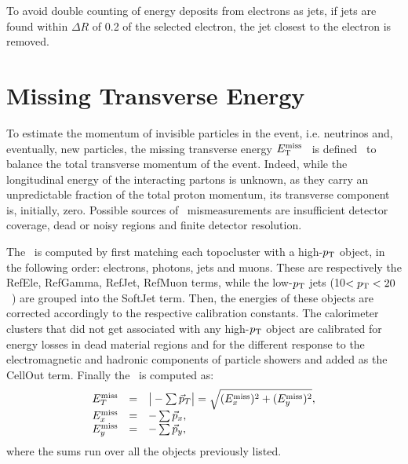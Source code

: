 To avoid double counting of energy deposits from electrons as jets,
if jets are found within $\Delta R$ of 0.2 of the selected electron, the
jet closest to the electron is removed. 


\myskip
\section{Missing Transverse Energy}\label{sec:met}

To estimate the momentum of invisible particles in the event, i.e. neutrinos and, eventually, new particles,
the missing transverse energy $\met$~\cite{met} is defined~\cite{topcommon2013} to balance the total transverse momentum of the event.
Indeed, while the longitudinal energy of the interacting partons is unknown, as they carry an unpredictable
fraction of the total proton momentum, its transverse component is, initially, zero.
Possible sources of \met\ mismeasurements are
insufficient detector coverage, dead or noisy regions and
finite detector resolution.

The \met\ is computed by first matching each topocluster
with a high-$\pt$ object,  in the following order: electrons, photons, jets and muons.
These are respectively the RefEle, RefGamma, RefJet, RefMuon terms, while 
the low-$\pt$ jets (10$<\pt<20$~\gev)
are grouped into the SoftJet term. Then, the energies of these objects are
corrected accordingly to the respective calibration constants. 
The calorimeter clusters
that did not get associated with any  high-$\pt$ object are calibrated for energy losses in 
dead material regions and for the different response to the electromagnetic and hadronic
components of particle showers and added as the CellOut term. 
Finally the \met\ is computed as:
\begin{equation}\label{eq:met}
\begin{array}{lcl}
E^{\rm miss}_{T} & = & \big|-\sum\vec{p}_T \big| = \sqrt{(E^{\rm miss}_{x})^2 + (E^{\rm miss}_{y})^2} ,\\
E^{\rm miss}_{x} & = & -\sum\vec{p}_x ,\\
E^{\rm miss}_{y} & = & -\sum\vec{p}_y ,\\
\end{array}	\end{equation}
where the sums run over all the objects previously listed.

